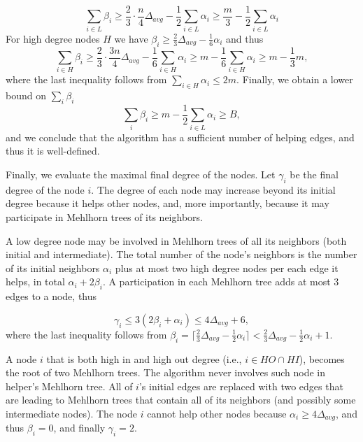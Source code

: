 \documentclass{article}
\begin{document}
  $$\sum_{i \in L}\beta_i \geq \frac{2}{3}\cdot\frac{n}{4}\Delta_{avg} - \frac{1}{2}\sum_{i \in L}\alpha_i \geq \frac{m}{3} - \frac{1}{2}\sum_{i \in L}\alpha_i$$
  For high degree nodes $H$ we have 
  $\beta_i \geq \frac{2}{3}\Delta_{avg}-\frac{1}{6}\alpha_i$
  and thus
  $$\sum_{i \in H}\beta_i \geq \frac{2}{3}\cdot\frac{3n}{4}\Delta_{avg} - \frac{1}{6}\sum_{i \in H}\alpha_i \geq m - \frac{1}{6}\sum_{i \in H}\alpha_i \geq m - \frac{1}{3}m,$$
  where the last inequality follows from $\sum_{i \in H}\alpha_i \leq 2m$.
Finally, we obtain a lower bound on
$\sum_{i}\beta_i$
$$\sum_{i}\beta_i \geq m - \frac{1}{2}\sum_{i \in L}\alpha_i \geq B,$$
and we conclude that the algorithm has a sufficient number of
helping edges, and thus it is well-defined.

\medskip

Finally, we evaluate the maximal final degree of the nodes.
Let $\gamma_i$ be the final degree of the node $i$.
The degree of each node may increase beyond its initial degree because it helps other nodes, and, more importantly, because it may participate in Mehlhorn trees of its neighbors.

\medskip

A low degree node may be involved in Mehlhorn trees of all its neighbors (both initial and intermediate). 
The total number of the node's neighbors is the number of its initial neighbors $\alpha_i$
plus at most two high degree nodes per each edge it helps, in total $\alpha_i + 2\beta_i$.
A participation in each Mehlhorn tree adds at most $3$ edges to a node, thus

  $$\gamma_i \leq 3(2\beta_i +\alpha_i) \leq 4\Delta_{avg} + 6,$$
  where the last inequality follows from 
  $\beta_i = \lceil\frac{2}{3}\Delta_{avg}-\frac{1}{2}\alpha_i\rceil < \frac{2}{3}\Delta_{avg} - \frac{1}{2}\alpha_i + 1$.

\medskip

A node $i$ that is both high in and high out degree (i.e., $i \in HO \cap HI$),
becomes the root of two Mehlhorn trees. 
The algorithm never involves such node in helper's Mehlhorn tree.
All of $i$'s initial edges are replaced with two edges that are leading to Mehlhorn trees that contain all of its neighbors (and possibly some intermediate nodes).
The node $i$ cannot help other nodes because $\alpha_i \geq 4\Delta_{avg}$, and thus $\beta_i = 0$, and finally $\gamma_i = 2$.

\medskip
\end{document}
